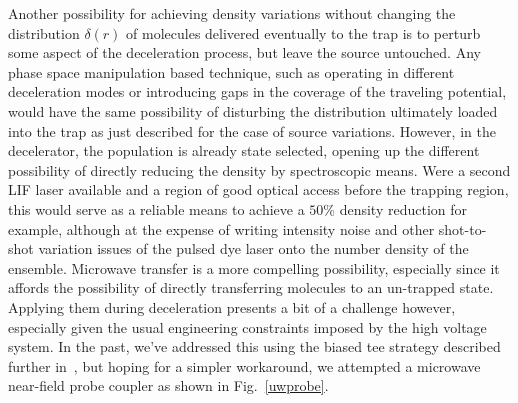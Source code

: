 
Another possibility for achieving density variations without changing the distribution $\delta(r)$ of molecules delivered eventually to the trap is to perturb some aspect of the deceleration process, but leave the source untouched.
Any phase space manipulation based technique, such as operating in different deceleration modes or introducing gaps in the coverage of the traveling potential, would have the same possibility of disturbing the distribution ultimately loaded into the trap as just described for the case of source variations.
However, in the decelerator, the population is already state selected, opening up the different possibility of directly reducing the density by spectroscopic means.
Were a second LIF laser available and a region of good optical access before the trapping region, this would serve as a reliable means to achieve a $50\%$ density reduction for example, although at the expense of writing intensity noise and other shot-to-shot variation issues of the pulsed dye laser onto the number density of the ensemble.
Microwave transfer is a more compelling possibility, especially since it affords the possibility of directly transferring molecules to an un-trapped state.
Applying them during deceleration presents a bit of a challenge however, especially given the usual engineering constraints imposed by the high voltage system.
In the past, we've addressed this using the biased tee strategy described further in~\cite{Stuhl2012uwave}, but hoping for a simpler workaround, we attempted a microwave near-field probe coupler as shown in Fig.~\ref{uwprobe}.


